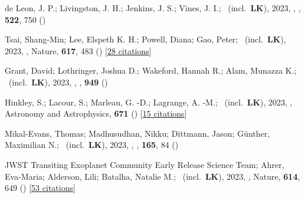 \item[{\color{numcolor}\scriptsize89}] de Leon, J. P.; Livingston, J. H.; Jenkins, J. S.; Vines, J. I.; \etal\ (incl.\ \textbf{LK}), 2023, , \mnras, \textbf{522}, 750 ()

\item[{\color{numcolor}\scriptsize88}] Tsai, Shang-Min; Lee, Elspeth K. H.; Powell, Diana; Gao, Peter; \etal\ (incl.\ \textbf{LK}), 2023, , Nature, \textbf{617}, 483 () [\href{https://ui.adsabs.harvard.edu/abs/2023Natur.617..483T}{28 citations}]

\item[{\color{numcolor}\scriptsize87}] Grant, David; Lothringer, Joshua D.; Wakeford, Hannah R.; Alam, Munazza K.; \etal\ (incl.\ \textbf{LK}), 2023, , \apj, \textbf{949} ()

\item[{\color{numcolor}\scriptsize86}] Hinkley, S.; Lacour, S.; Marleau, G. -D.; Lagrange, A. -M.; \etal\ (incl.\ \textbf{LK}), 2023, , Astronomy and Astrophysics, \textbf{671} () [\href{https://ui.adsabs.harvard.edu/abs/2023A&A...671L...5H}{15 citations}]

\item[{\color{numcolor}\scriptsize85}] Mikal-Evans, Thomas; Madhusudhan, Nikku; Dittmann, Jason; G{\"u}nther, Maximilian N.; \etal\ (incl.\ \textbf{LK}), 2023, , \aj, \textbf{165}, 84 ()

\item[{\color{numcolor}\scriptsize84}] JWST Transiting Exoplanet Community Early Release Science Team; Ahrer, Eva-Maria; Alderson, Lili; Batalha, Natalie M.; \etal\ (incl.\ \textbf{LK}), 2023, , Nature, \textbf{614}, 649 () [\href{https://ui.adsabs.harvard.edu/abs/2023Natur.614..649J}{53 citations}]

